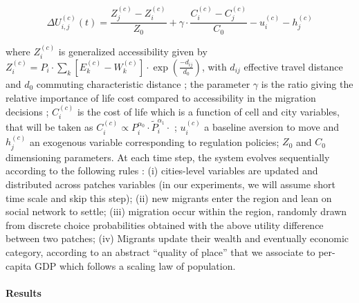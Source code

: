 \[
\Delta U_{i,j}^{(c)}(t) = \frac{Z_j^{(c)}- Z_i^{(c)}}{Z_0} + \gamma \cdot \frac{C_i^{(c)}- C_j^{(c)}}{C_0} - u_i^{(c)} - h_j^{(c)}
\]

where $Z_i^{(c)}$ is generalized accessibility given by $Z_i^{(c)} = P_i \cdot \sum_k \left[E_k^{(c)}-W_k^{(c)}\right]\cdot \exp{\left(\frac{-d_{ij}}{d_0}\right)}$, with $d_{ij}$ effective travel distance %
 and $d_0$ commuting characteristic distance ; the parameter $\gamma$ is the ratio giving the relative importance of life cost compared to accessibility in the migration decisions ; $C_i^{(c)}$ is the cost of life which is a function of cell and city variables, that will be taken as $C_i^{(c)} \propto P_i^{\alpha_0}\cdot  \tilde{P}_i^{\alpha_1}\cdot$ ; $u_i^{(c)}$ a baseline aversion to move and $h_j^{(c)}$ an exogenous variable corresponding to regulation policies; $Z_0$ and $C_0$ dimensioning parameters. At each time step, the system evolves sequentially according to the following rules : (i) cities-level variables are updated and distributed across patches variables (in our experiments, we will assume short time scale and skip this step); (ii) new migrants enter the region and lean on social network to settle; (iii) migration occur within the region, randomly drawn from discrete choice probabilities obtained with the above utility difference between two patches; (iv) Migrants update their wealth and eventually economic category, according to an abstract ``quality of place'' that we associate to per-capita GDP which follows a scaling law of population.



\paragraph{Results}

